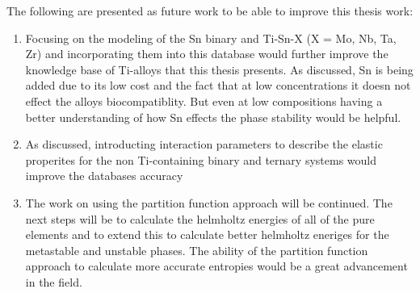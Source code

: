The following are presented as future work to be able to improve this thesis work:
\begin{enumerate}
	\item Focusing on the modeling of the Sn binary and Ti-Sn-X (X = Mo, Nb, Ta, Zr) and incorporating them into this database would further improve the knowledge base of Ti-alloys that this thesis presents. As discussed, Sn is being added due to its low cost and the fact that at low concentrations it doesn not effect the alloys biocompatiblity. But even at low compositions having a better understanding of how Sn effects the phase stability would be helpful.
	\item As discussed, introducting interaction parameters to describe the elastic properites for the non Ti-containing binary and ternary systems would improve the databases accuracy
	\item The work on using the partition function approach will be continued. The next steps will be to calculate the helmholtz energies of all of the pure elements and to extend this to calculate better helmholtz eneriges for the metastable  and unstable phases. The ability of the partition function approach to calculate more accurate entropies would be a great advancement in the field. 
\end{enumerate}